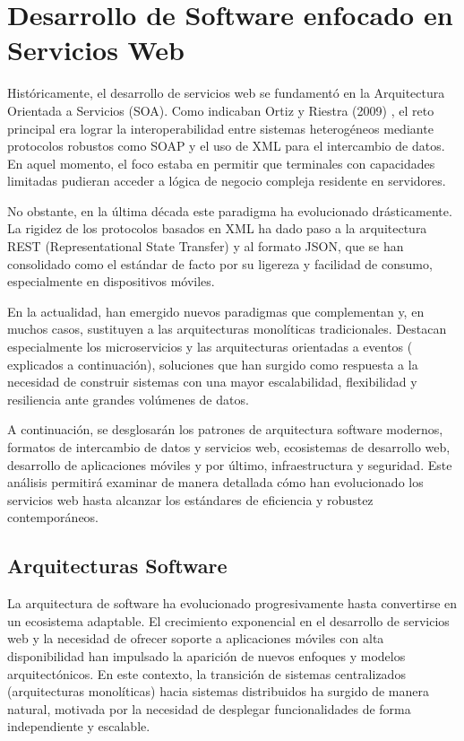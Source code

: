 \section{Desarrollo de Software enfocado en Servicios Web}

Históricamente, el desarrollo de servicios web se fundamentó en la Arquitectura Orientada a Servicios (SOA). Como 
indicaban Ortiz y Riestra (2009) \cite{evolucionDinamicaSistemasSoftware}, el reto principal era lograr la 
interoperabilidad entre sistemas heterogéneos mediante protocolos robustos como SOAP y el uso de XML para el 
intercambio de datos. En aquel momento, el foco estaba en permitir que terminales con capacidades limitadas pudieran
acceder a lógica de negocio compleja residente en servidores.

No obstante, en la última década este paradigma ha evolucionado drásticamente. La rigidez de los protocolos basados 
en XML ha dado paso a la arquitectura REST (Representational State Transfer) y al formato JSON, que se han consolidado
como el estándar de facto por su ligereza y facilidad de consumo, especialmente en dispositivos móviles.

En la actualidad, han emergido nuevos paradigmas que complementan y, en muchos casos, sustituyen a las arquitecturas 
monolíticas tradicionales. Destacan especialmente los microservicios y las arquitecturas orientadas a eventos (
explicados a continuación), soluciones que han surgido como respuesta a la necesidad de construir sistemas con una 
mayor escalabilidad, flexibilidad y resiliencia ante grandes volúmenes de datos.

A continuación, se desglosarán los patrones de arquitectura software modernos, formatos de intercambio de datos y  
servicios web, ecosistemas de desarrollo web, desarrollo de aplicaciones móviles y por último, infraestructura
y seguridad. Este análisis permitirá examinar de manera detallada cómo han evolucionado los servicios web hasta 
alcanzar los estándares de eficiencia y robustez contemporáneos.

\subsection{Arquitecturas Software}

La arquitectura de software ha evolucionado progresivamente hasta convertirse en un ecosistema adaptable. El 
crecimiento exponencial en el desarrollo de servicios web y la necesidad de ofrecer soporte a aplicaciones móviles 
con alta disponibilidad han impulsado la aparición de nuevos enfoques y modelos arquitectónicos. En este contexto, 
la transición de sistemas centralizados (arquitecturas monolíticas) hacia sistemas distribuidos ha surgido de manera 
natural, motivada por la necesidad de desplegar funcionalidades de forma independiente y escalable.

